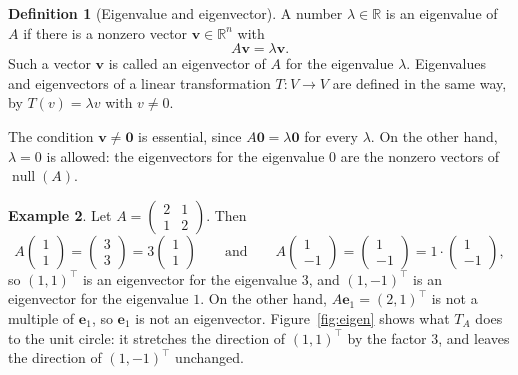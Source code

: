 \documentclass[11pt]{article}
\theoremstyle{definition}
\newtheorem{definition}{Definition}[section]
\newtheorem{example}[definition]{Example}
\theoremstyle{plain}
\theoremstyle{remark}
\DeclareMathOperator{\Null}{null}
\begin{document}
\begin{definition}[Eigenvalue and eigenvector]
    A number $\lambda \in \mathbb{R}$ is an eigenvalue of $A$ if there is a nonzero vector $\mathbf{v} \in \mathbb{R}^n$ with
    \[A\mathbf{v} = \lambda \mathbf{v}.\]
    Such a vector $\mathbf{v}$ is called an eigenvector of $A$ for the eigenvalue $\lambda$. Eigenvalues and eigenvectors of a linear transformation $T: V \to V$ are defined in the same way, by $T(v) = \lambda v$ with $v \neq 0$.
\end{definition}

The condition $\mathbf{v} \neq \mathbf{0}$ is essential, since $A\mathbf{0} = \lambda \mathbf{0}$ for every $\lambda$. On the other hand, $\lambda = 0$ is allowed: the eigenvectors for the eigenvalue $0$ are the nonzero vectors of $\Null(A)$.

\begin{example}\label{ex:eigen-first}
    Let $A = \begin{pmatrix} 2 & 1 \\ 1 & 2 \end{pmatrix}$. Then
    \[A \begin{pmatrix} 1 \\ 1 \end{pmatrix} = \begin{pmatrix} 3 \\ 3 \end{pmatrix} = 3 \begin{pmatrix} 1 \\ 1 \end{pmatrix} \qquad \text{and} \qquad A \begin{pmatrix} 1 \\ -1 \end{pmatrix} = \begin{pmatrix} 1 \\ -1 \end{pmatrix} = 1 \cdot \begin{pmatrix} 1 \\ -1 \end{pmatrix},\]
    so $(1, 1)^\top$ is an eigenvector for the eigenvalue $3$, and $(1, -1)^\top$ is an eigenvector for the eigenvalue $1$. On the other hand, $A \mathbf{e}_1 = (2, 1)^\top$ is not a multiple of $\mathbf{e}_1$, so $\mathbf{e}_1$ is not an eigenvector. Figure~\ref{fig:eigen} shows what $T_A$ does to the unit circle: it stretches the direction of $(1, 1)^\top$ by the factor $3$, and leaves the direction of $(1, -1)^\top$ unchanged.
\end{example}
\end{document}
